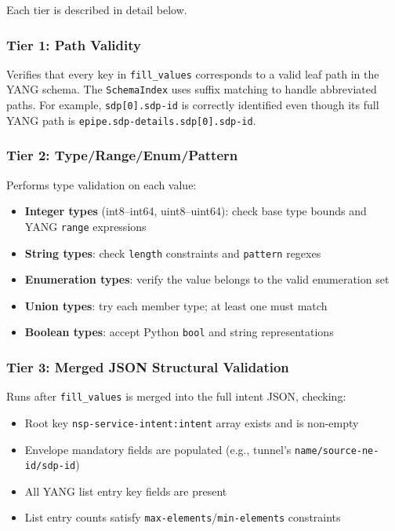 \documentclass[12pt, a4paper]{article}
\newcommand{\yang}{\textsc{YANG}}
\newcommand{\fillvalues}{\texttt{fill\_values}}
\begin{document}
Each tier is described in detail below.

\subsubsection{Tier 1: Path Validity}

Verifies that every key in \fillvalues{} corresponds to a valid leaf path in the \yang{} schema. The \texttt{SchemaIndex} uses suffix matching to handle abbreviated paths. For example, \texttt{sdp[0].sdp-id} is correctly identified even though its full \yang{} path is \texttt{epipe.sdp-details.sdp[0].sdp-id}.

\subsubsection{Tier 2: Type/Range/Enum/Pattern}

Performs type validation on each value:

\begin{itemize}
  \item \textbf{Integer types} (int8--int64, uint8--uint64): check base type bounds and \yang{} \texttt{range} expressions
  \item \textbf{String types}: check \texttt{length} constraints and \texttt{pattern} regexes
  \item \textbf{Enumeration types}: verify the value belongs to the valid enumeration set
  \item \textbf{Union types}: try each member type; at least one must match
  \item \textbf{Boolean types}: accept Python \texttt{bool} and string representations
\end{itemize}

\subsubsection{Tier 3: Merged JSON Structural Validation}

Runs after \fillvalues{} is merged into the full intent JSON, checking:

\begin{itemize}
  \item Root key \texttt{nsp-service-intent:intent} array exists and is non-empty
  \item Envelope mandatory fields are populated (e.g., tunnel's \texttt{name/source-ne-id/sdp-id})
  \item All \yang{} list entry key fields are present
  \item List entry counts satisfy \texttt{max-elements}/\texttt{min-elements} constraints
\end{itemize}
\end{document}
